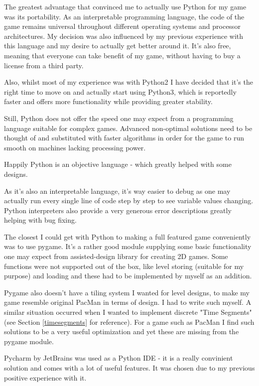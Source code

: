 \documentclass[11pt,a4paper]{report}
\begin{document}
			The greatest advantage that convinced me to actually use Python for my game was its portability. As an interpretable programming language, the code of the game remains universal throughout different operating systems and processor architectures. My decision was also influenced by my previous experience with this language and my desire to actually get better around it. It's also free, meaning that everyone can take benefit of my game, without having to buy a license from a third party.
			
			Also, whilst most of my experience was with Python2 I have decided that it's the right time to move on and actually start using Python3, which is reportedly faster and offers more functionality while providing greater stability.
			
			Still, Python does not offer the speed one may expect from a programming language suitable for complex games. Advanced non-optimal solutions need to be thought of and substituted with faster algorithms in order for the game to run smooth on machines lacking processing power.
			
			Happily Python is an objective language - which greatly helped with some designs.
			
			As it's also an interpretable language, it's way easier to debug as one may actually run every single line of code step by step to see variable values changing. Python interpreters also provide a very generous error descriptions greatly helping with bug fixing. 
			
			The closest I could get with Python to making a full featured game conveniently was to use pygame. It's a rather good module supplying some basic functionality one may expect from assisted-design library for creating 2D games. Some functions were not supported out of the box, like level storing (suitable for my purpose) and loading and these had to be implemented by myself as an addition.
			
			Pygame also doesn't have a tiling system I wanted for level designs, to make my game resemble original PacMan in terms of design. I had to write such myself. A similar situation occurred when I wanted to implement discrete "Time Segments" (see Section \ref{timesegments} for reference). For a game such as PacMan I find such solutions to be a very useful optimization and yet these are missing from the pygame module.
			
			Pycharm by JetBrains was used as a Python IDE - it is a really convinient solution and comes with a lot of useful features. It was chosen due to my previous positive experience with it.
			
\end{document}
